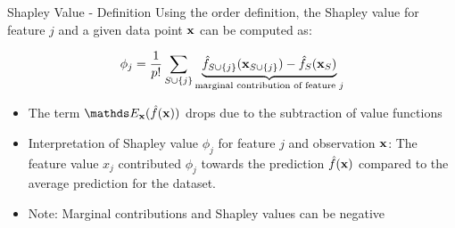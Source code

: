 \documentclass[11pt,compress,t,notes=noshow, aspectratio=169, xcolor=table]{beamer}
\begin{document}
\begin{vbframe}{Shapley Value - Definition  }
  Using the order definition, the Shapley value for feature $j$ and a given data point $\xv$ can be computed as:

     $$ \phi_j  = \frac{1}{p!} \sum_{\Scupj} \underbrace{\fh_{\Scupj}(\xv_{\Scupj}) - \fh_{S}(\xv_{S})}_{\text{marginal contribution of feature $j$}} $$
\begin{itemize}
    \item The term $\E_{\xv}(\fh(\xv))$ drops due to the subtraction of value functions
  \item Interpretation of Shapley value $\phi_j$ for feature $j$ and observation $\xv$:
  The feature value $x_j$ contributed $\phi_j$ towards the prediction $\fh(\xv)$ compared to the average prediction for the dataset.
   \item Note: Marginal contributions and Shapley values can be negative
\end{itemize}
\lz

\end{vbframe}
\end{document}
